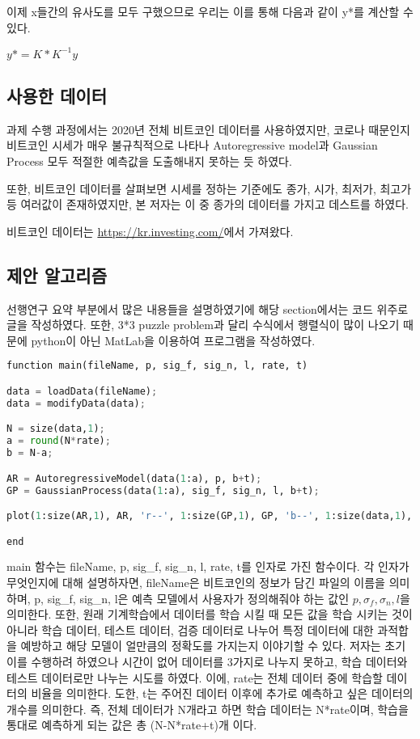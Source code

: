 \documentclass[manuscript,screen,review]{acmart}
\begin{document}
이제 x들간의 유사도를 모두 구했으므로 우리는 이를 통해 다음과 같이 y*를 계산할 수 있다.

\begin{math}
  y* = K*K^{-1}y
\end{math}

\subsection{사용한 데이터}

과제 수행 과정에서는 2020년 전체 비트코인 데이터를 사용하였지만, 코로나 때문인지 비트코인 시세가 매우 불규칙적으로 나타나 Autoregressive model과 Gaussian Process 모두 적절한 예측값을 도출해내지 못하는 듯 하였다.

또한, 비트코인 데이터를 살펴보면 시세를 정하는 기준에도 종가, 시가, 최저가, 최고가 등 여러값이 존재하였지만, 본 저자는 이 중 종가의 데이터를 가지고 데스트를 하였다.

비트코인 데이터는 \url{https://kr.investing.com/}에서 가져왔다.


\subsection{제안 알고리즘}

선행연구 요약 부분에서 많은 내용들을 설명하였기에 해당 section에서는 코드 위주로 글을 작성하였다. 또한, 3*3 puzzle problem과 달리 수식에서 행렬식이 많이 나오기 때문에 python이 아닌 MatLab을 이용하여 프로그램을 작성하였다.

\begin{lstlisting}[language=python, caption=main function] 
function main(fileName, p, sig_f, sig_n, l, rate, t)

data = loadData(fileName);
data = modifyData(data);

N = size(data,1);
a = round(N*rate);
b = N-a;

AR = AutoregressiveModel(data(1:a), p, b+t);
GP = GaussianProcess(data(1:a), sig_f, sig_n, l, b+t);

plot(1:size(AR,1), AR, 'r--', 1:size(GP,1), GP, 'b--', 1:size(data,1), data, '-');

end
\end{lstlisting}

main 함수는 fileName, p, sig_f, sig_n, l, rate, t를 인자로 가진 함수이다. 각 인자가 무엇인지에 대해 설명하자면, fileName은 비트코인의 정보가 담긴 파일의 이름을 의미하며, p, sig_f, sig_n, l은 예측 모델에서 사용자가 정의해줘야 하는 값인 $p, \sigma_f, \sigma_n, l$을 의미한다. 또한, 원래 기계학습에서 데이터를 학습 시킬 때 모든 값을 학습 시키는 것이 아니라 학습 데이터, 테스트 데이터, 검증 데이터로 나누어 특정 데이터에 대한 과적합을 예방하고 해당 모델이 얼만큼의 정확도를 가지는지 이야기할 수 있다. 저자는 초기 이를 수행하려 하였으나 시간이 없어 데이터를 3가지로 나누지 못하고, 학습 데이터와 테스트 데이터로만 나누는 시도를 하였다. 이에, rate는 전체 데이터 중에 학습할 데이터의 비율을 의미한다. 도한, t는 주어진 데이터 이후에 추가로 예측하고 싶은 데이터의 개수를 의미한다. 즉, 전체 데이터가 N개라고 하면 학습 데이터는 N*rate이며, 학습을 통대로 예측하게 되는 값은 총 (N-N*rate+t)개 이다.
\end{document}
